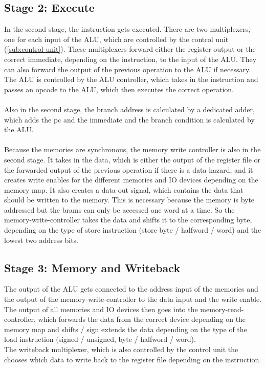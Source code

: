 \documentclass[12pt]{article}
\begin{document}
\subsection{Stage 2: Execute}
In the second stage, the instruction gets executed. There are two multiplexers, one for each input of the ALU, which are controlled by the control unit (\ref{sub:control-unit}). These multiplexers forward either the register output or the correct immediate, depending on the instruction, to the input of the ALU. They can also forward the output of the previous operation to the ALU if necessary. The ALU is controlled by the ALU controller, which takes in the instruction and passes an opcode to the ALU, which then executes the correct operation.\\\\
Also in the second stage, the branch address is calculated by a dedicated adder, which adds the pc and the immediate and the branch condition is calculated by the ALU.\\\\
Because the memories are synchronous, the memory write controller is also in the second stage. It takes in the data, which is either the output of the register file or the forwarded output of the previous operation if there is a data hazard, and it creates write enables for the different memories and IO devices depending on the memory map. It also creates a data out signal, which contains the data that should be written to the memory. This is necessary because the memory is byte addressed but the brams can only be accessed one word at a time. So the memory-write-controller takes the data and shifts it to the corresponding byte, depending on the type of store instruction (store byte / halfword / word) and the lowest two address bits.


\subsection*{Stage 3: Memory and Writeback}
The output of the ALU gets connected to the address input of the memories and the output of the memory-write-controller to the data input and the write enable. The output of all memories and IO devices then goes into the memory-read-controller, which forwards the data from the correct device depending on the memory map and shifts / sign extends the data depending on the type of the load instruction (signed / unsigned, byte / halfword / word).\\
The writeback multiplexer, which is also controlled by the control unit the chooses which data to write back to the register file depending on the instruction.
\end{document}
